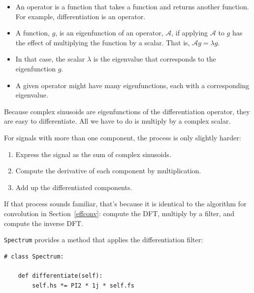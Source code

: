\documentclass[12pt]{book}
\begin{document}
\newcommand{\op}{\mathcal{A}}

\begin{itemize}

\item An operator is a function that takes a function and returns
another function.  For example, differentiation is an operator.

\item A function, $g$, is an eigenfunction of an operator, $\op$, if
applying $\op$ to $g$ has the effect of multiplying the function by
a scalar.  That is, $\op g = \lambda g$.

\item In that case, the scalar $\lambda$ is the eigenvalue that
corresponds to the eigenfunction $g$.

\item A given operator might have many eigenfunctions, each with
a corresponding eigenvalue. 

\end{itemize}

Because complex sinusoids are eigenfunctions of the differentiation
operator, they are easy to differentiate.  All we have to do is
multiply by a complex scalar.

For signals with more than one
component, the process is only slightly harder:

\begin{enumerate}

\item Express the signal as the sum of complex sinusoids.

\item Compute the derivative of each component by multiplication.

\item Add up the differentiated components.

\end{enumerate}

If that process sounds familiar, that's because it is identical
to the algorithm for convolution in Section~\ref{effconv}: compute
the DFT, multiply by a filter, and compute the inverse DFT.

{\tt Spectrum} provides a method that applies the differentiation
filter:

\begin{verbatim}
# class Spectrum:

    def differentiate(self):
        self.hs *= PI2 * 1j * self.fs
\end{verbatim}
\end{document}

